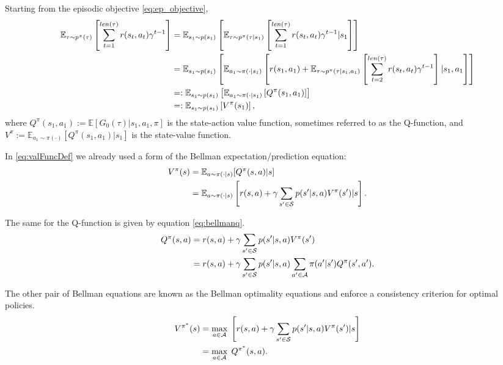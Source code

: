 \documentclass{report}
\numberwithin{equation}{section}
\numberwithin{figure}{section}
\numberwithin{table}{section}
\numberwithin{algorithm}{section}
\begin{document}
Starting from the episodic objective \ref{eq:ep_objective},
\begin{align}\label{eq:valFuncDef}
  \mathbb{E}_{\tau\sim p^{\pi}(\tau)}\left[\sum_{t=1}^{len(\tau)}r(s_t, a_t)\gamma^{t-1}\right]
  &=\mathbb{E}_{s_1\sim p(s_1)}\left[\mathbb{E}_{\tau\sim p^{\pi}(\tau|s_1)}\left[\sum_{t=1}^{len(\tau)}r(s_t, a_t)\gamma^{t-1}|s_1\right]\right]\notag\\
  &=\mathbb{E}_{s_1\sim p(s_1)}\left[
      \mathbb{E}_{a_1\sim \pi(\cdot|s_1)}\left[
          r(s_1, a_1) + 
          \mathbb{E}_{\tau\sim p^{\pi}(\tau|s_1,a_1)}\left[\sum_{t=2}^{len(\tau)}r(s_t, a_t)\gamma^{t-1}\right]|s_1,a_1
        \right]
    \right]\notag\\
  &=:\mathbb{E}_{s_1\sim p(s_1)}\left[
      \mathbb{E}_{a_1\sim \pi(\cdot|s_1)}\left[Q^{\pi}(s_1,a_1)\right]
      \right]\notag\\
      &=:\mathbb{E}_{s_1\sim p(s_1)}\left[
        V^{\pi}(s_1)
      \right],
\end{align}
where $Q^{\pi}(s_1,a_1):=\mathbb{E}[G_0(\tau)|s_1, a_1, \pi]$ is the state-action value function,  
sometimes referred to as the Q-function, and $V^{\pi}:=\mathbb{E}_{a_1\sim\pi(\cdot)}[Q^{\pi}(s_1, a_1)|s_1]$ is the state-value 
function.

In \ref{eq:valFuncDef} we already used a form of the Bellman expectation/prediction 
equation:
\begin{align}\label{eq:bellmanv}
  V^{\pi}(s)&=\mathbb{E}_{a\sim \pi(\cdot|s)}[Q^{\pi}(s, a)|s]\notag\\
  &=\mathbb{E}_{a\sim \pi(\cdot|s)}\left[r(s, a) + \gamma \sum_{s'\in \mathcal{S}}p(s'|s,a)V^{\pi}(s')|s\right].
\end{align}

The same for the Q-function is given by equation \ref{eq:bellmanq}.
\begin{align}\label{eq:bellmanq}
  Q^{\pi}(s, a)&=r(s, a) + \gamma \sum_{s'\in \mathcal{S}}p(s'|s, a)V^{\pi}(s')\notag\\
  &= r(s,a) + \gamma \sum_{s'\in \mathcal{S}}p(s'|s, a)\sum_{a'\in \mathcal{A}}\pi(a'|s')Q^{\pi}(s', a').
\end{align}

The other pair of Bellman equations are known as the Bellman optimality 
equations and enforce a consistency criterion for optimal policies. 
\begin{align}\label{eq:bellmanOptV}
  V^{\pi^*}(s)&=\max_{a\in \mathcal{A}}\; \left[r(s, a) + \gamma \sum_{s'\in \mathcal{S}}p(s'|s,a)V^{\pi}(s')|s\right]\notag\\
  &=\max_{a\in \mathcal{A}}\;Q^{\pi^*}(s, a).
\end{align}
\end{document}

